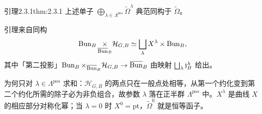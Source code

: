 \begin{othm}{引理}{2.3.1}{thm:2.3.1}
上述单子 $\bigoplus_{\lambda\in\Lambda^{pos}}\widetilde\Omega^\lambda$ 典范同构于 $\widetilde\Omega$。
\end{othm}

引理来自同构
\[
  \operatorname{Bun}_B\underset{\overline{\mathrm{Bun}}_B}{\times}\mathcal H_{G,B}\simeq\bigsqcup_\lambda X^\lambda\times\operatorname{Bun}_B,
\]
其中「第二投影」$\operatorname{Bun}_B\times_{\overline{\mathrm{Bun}}_B}\mathcal H_{G,B}\to\overline{\mathrm{Bun}}_B$ 由映射 $\bigsqcup_\lambda\mathfrak{j}_B^\lambda$ 给出。

\begin{annote}
为何只对 $\lambda\in\Lambda^{pos}$ 求和：$\mathcal H_{G,B}$ 的两点只在一般点处相等，从第一个约化变到第二个约化所需的除子必为非负组合，故参数 $\lambda$ 落在正半群 $\Lambda^{pos}$ 中。$X^\lambda$ 是曲线 $X$ 的相应部分对称化幂；当 $\lambda=0$ 时 $X^0=\mathrm{pt}$，$\widetilde\Omega^0$ 就是恒等函子。\par{}
\end{annote}
